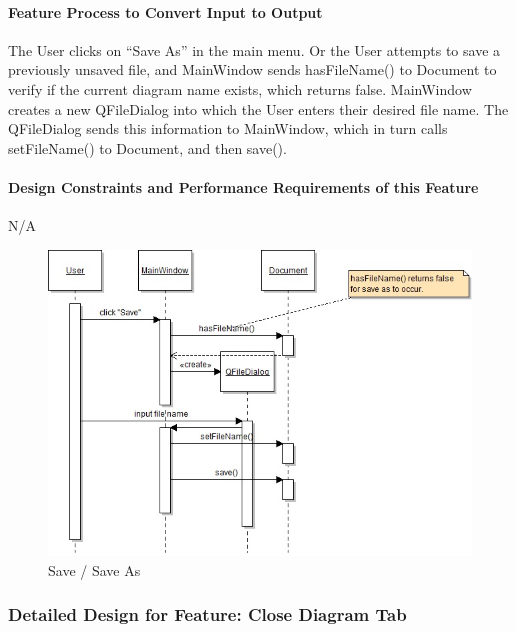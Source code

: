 \documentclass[twoside,letterpaper]{article}
\begin{document}
{\paragraph{Feature Process to Convert Input to Output}
{
The User clicks on ``Save As'' in the main menu. \newline
Or the User attempts to save a previously unsaved file, and MainWindow sends hasFileName() to Document to verify if the current diagram name exists, which returns false. \newline
MainWindow creates a new QFileDialog into which the User enters their desired file name. The QFileDialog sends this information to MainWindow, which in turn calls setFileName() to Document, and then save().
}

\paragraph{Design Constraints and Performance Requirements of this Feature}
{
N/A
}
\bigskip
\bigskip

\begin{figure}[h]
\centering
\includegraphics[width=6.0in]{IntSaveAs.jpg}
\caption{Save / Save As}
\end{figure}

\clearpage





% 
%

\subsubsection{Detailed Design for Feature: Close Diagram Tab }
}
\end{document}
